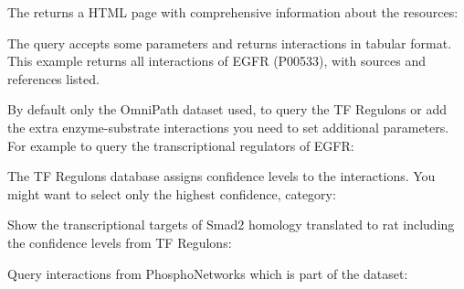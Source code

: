\documentclass[letterpaper,10pt,english]{sphinxmanual}
\begin{document}
The  returns a HTML page with comprehensive information about the
resources:
\begin{quote}

\end{quote}

The  query accepts some parameters and returns interactions in
tabular format. This example returns all interactions of EGFR (P00533), with
sources and references listed.
\begin{quote}

\end{quote}

By default only the OmniPath dataset used, to query the TF Regulons or add the
extra enzyme-substrate interactions you need to set additional parameters. For
example to query the transcriptional regulators of EGFR:
\begin{quote}

\end{quote}

The TF Regulons database assigns confidence levels to the interactions. You
might want to select only the highest confidence,  category:
\begin{quote}

\end{quote}

Show the transcriptional targets of Smad2 homology translated to rat including
the confidence levels from TF Regulons:
\begin{quote}

\end{quote}

Query interactions from PhosphoNetworks which is part of the 
dataset:
\begin{quote}

\end{quote}
\end{document}
